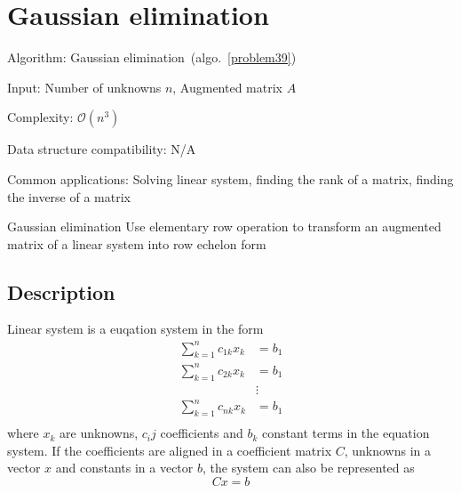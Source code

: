 \documentclass{article}
\begin{document}
\fi

%
%

\def\pbname{Gaussian elimination} %

\section{\pbname} 

\begin{overview}
\item [Algorithm:]Gaussian elimination~(algo.~\ref{problem39}) 
\item [Input:] Number of unknowns $n$, Augmented matrix $A$
\item [Complexity:]  $\mathcal{O}(n^3)$
\item [Data structure compatibility:] N/A
\item [Common applications:] Solving linear system, finding the rank of a matrix, finding the inverse of a matrix
\end{overview}



\begin{problem}{\pbname}
	Use elementary row operation to transform an augmented matrix of a linear system into row echelon form
\end{problem}

\subsection*{Description}
Linear system is a euqation system in the form 
\begin{align*}
\sum_{k=1}^nc_{1k}x_k&=b_1\\
\sum_{k=1}^nc_{2k}x_k&=b_1\\
&\vdots\\
\sum_{k=1}^nc_{nk}x_k&=b_1\\
\end{align*}
where $x_k$ are unknowns, $c_ij$ coefficients and $b_k$ constant terms in the equation system. If the coefficients are aligned in a coefficient matrix $C$, unknowns in a vector $x$ and constants in a vector $b$, the system can also be represented as $$Cx=b$$ 
\end{document}
